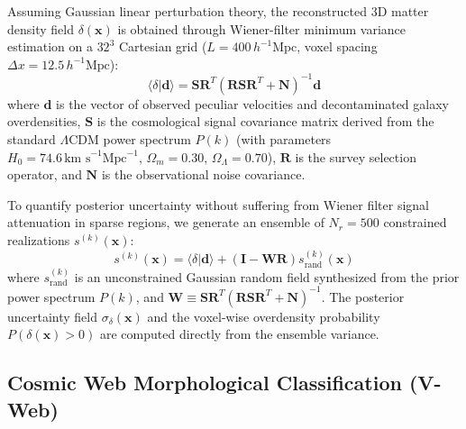 \documentclass[11pt,a4paper]{article}
\begin{document}
Assuming Gaussian linear perturbation theory, the reconstructed 3D matter density field $\delta(\mathbf{x})$ is obtained through Wiener-filter minimum variance estimation on a $32^3$ Cartesian grid ($L = 400\,h^{-1}\text{Mpc}$, voxel spacing $\Delta x = 12.5\,h^{-1}\text{Mpc}$):
\begin{equation}
\langle \delta | \mathbf{d} \rangle = \mathbf{S} \mathbf{R}^T \left( \mathbf{R} \mathbf{S} \mathbf{R}^T + \mathbf{N} \right)^{-1} \mathbf{d}
\end{equation}
where $\mathbf{d}$ is the vector of observed peculiar velocities and decontaminated galaxy overdensities, $\mathbf{S}$ is the cosmological signal covariance matrix derived from the standard $\Lambda$CDM power spectrum $P(k)$ (with parameters $H_0 = 74.6\,\text{km s}^{-1}\text{Mpc}^{-1}$, $\Omega_m = 0.30$, $\Omega_\Lambda = 0.70$), $\mathbf{R}$ is the survey selection operator, and $\mathbf{N}$ is the observational noise covariance.

To quantify posterior uncertainty without suffering from Wiener filter signal attenuation in sparse regions, we generate an ensemble of $N_r = 500$ constrained realizations $s^{(k)}(\mathbf{x})$:
\begin{equation}
s^{(k)}(\mathbf{x}) = \langle \delta | \mathbf{d} \rangle + \left( \mathbf{I} - \mathbf{W}\mathbf{R} \right) s_{\text{rand}}^{(k)}(\mathbf{x})
\end{equation}
where $s_{\text{rand}}^{(k)}$ is an unconstrained Gaussian random field synthesized from the prior power spectrum $P(k)$, and $\mathbf{W} \equiv \mathbf{S} \mathbf{R}^T (\mathbf{R}\mathbf{S}\mathbf{R}^T + \mathbf{N})^{-1}$. The posterior uncertainty field $\sigma_\delta(\mathbf{x})$ and the voxel-wise overdensity probability $P(\delta(\mathbf{x}) > 0)$ are computed directly from the ensemble variance.

\subsection{Cosmic Web Morphological Classification (V-Web)}
\end{document}
